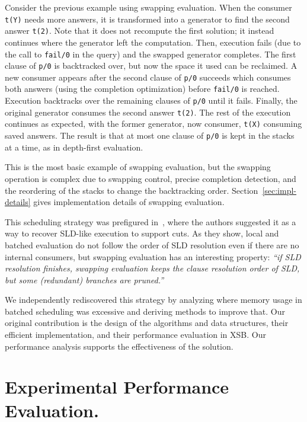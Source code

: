 \documentclass{./tlp}
\newcommand{\redsect}{\vspace{-1em}}
\begin{document}
Consider the previous example using swapping evaluation. When the
consumer \lstinline{t(Y)} needs more answers, it is transformed into
a generator to find the second answer
\lstinline{t(2)}.  Note that it does not recompute the first
  solution; it instead continues where the generator left the computation.
Then, execution fails (due to the call to \lstinline{fail/0} in the
query) and the swapped generator completes. The first clause of
\lstinline{p/0} is backtracked over, but now the space it used can be
reclaimed. A new consumer appears after the second clause of
\lstinline{p/0} succeeds which consumes both answers (using the
completion optimization) before \lstinline{fail/0} is
reached. Execution backtracks over the remaining clauses of
\lstinline{p/0} until it fails. Finally, the original
generator consumes the second answer \lstinline{t(2)}. The rest of the
execution continues as expected, with the former generator, now
consumer, \lstinline{t(X)} consuming saved answers. The result is that
at most one clause of \lstinline{p/0} is kept in the stacks at a time,
as in depth-first evaluation.

This is the most basic example of swapping evaluation, but the
swapping operation is complex due to swapping control, precise
completion detection, and the reordering of the stacks to change the
backtracking order. Section~\ref{sec:impl-details} gives
implementation details of swapping evaluation.
 




This scheduling strategy was prefigured in~\cite{JET-sagonas-PPDP},
where the authors suggested it as a way to recover SLD-like execution
to support cuts.  As they show, local and batched
evaluation do not follow the order of SLD resolution even if there are
no internal consumers, but swapping evaluation has an interesting
property: \emph{``if SLD resolution finishes, swapping evaluation
  keeps the clause resolution order of SLD, but some (redundant)
  branches are pruned.''}

We independently rediscovered this strategy by analyzing where memory
usage in batched scheduling was excessive and deriving methods to
improve that.  Our original contribution is the design of the
algorithms and data structures, their efficient implementation, and
their performance evaluation in XSB.  Our performance analysis
supports the effectiveness of the solution.



\redsect
\section{Experimental Performance Evaluation.} 
\label{sec:performance} 
 
\end{document}
